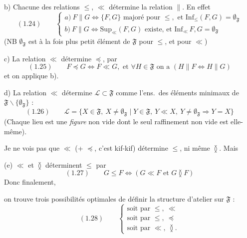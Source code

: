 \documentclass[11pt,a4paper]{article}
\begin{document}


b) Chacune des relations $\leq$, $\ll$ détermine la relation $\parallel$. En effet
\[
  (1.24) \qquad
  \begin{cases}
    a)\ F \parallel G \iff \lbrace F, G \rbrace \text{ majoré pour } \leq, \text{ et } \mathrm{Inf}_{\leq}(F,G) = \emptyset_{\mathfrak{F}} \\
    b)\ F \parallel G \iff \mathrm{Sup}_{\ll}(F,G) \text{ existe, et } \mathrm{Inf}_{\ll}\, F,G = \emptyset_{\mathfrak{F}}
  \end{cases}
\]
(NB $\emptyset_{\mathfrak{F}}$ est à la fois plus petit élément de $\mathfrak{F}$ pour $\leq$, et pour $\ll$)

c) La relation $\ll$ détermine $\preccurlyeq$, par
\[
  (1.25) \qquad F \preccurlyeq G \iff F \ll G, \text{ et } \forall H \in \mathfrak{F} \text{ on a } (H \parallel F \iff H \parallel G)
\]
et on applique b).

d) La relation $\ll$ détermine $\mathcal{L} \subset \mathfrak{F}$ comme l'ens.\ des éléments minimaux de $\mathfrak{F} \smallsetminus \lbrace \emptyset_{\mathfrak{F}} \rbrace$ :
\[
  (1.26) \qquad \mathcal{L} = \lbrace X \in \mathfrak{F},\ X \neq \emptyset_{\mathfrak{F}} \mid Y \in \mathfrak{F},\ Y \ll X,\ Y \neq \emptyset_{\mathfrak{F}} \Rightarrow Y = X \rbrace
\]
(Chaque lieu est une \emph{figure} non vide dont le seul raffinement non vide est elle-même).

Je ne vois pas que $\ll$ (+ $\preccurlyeq$, c'est kif-kif) détermine $\leq$, ni même $\between$. Mais

(e) $\ll$ et $\between$ déterminent $\leq$ par
\[
  (1.27) \qquad G \leq F \iff (G \ll F \text{ et } G \between F)
\]
Donc finalement,

on trouve trois possibilités optimales de définir la structure d'atelier sur $\mathfrak{F}$ :
\[
  (1.28) \qquad
  \begin{cases}
    \text{soit par } \boxed{\leq,\ \ll} \\
    \text{soit par } \leq,\ \preccurlyeq \\
    \text{soit par } \ll,\ \between .
  \end{cases}
\]
\end{document}
